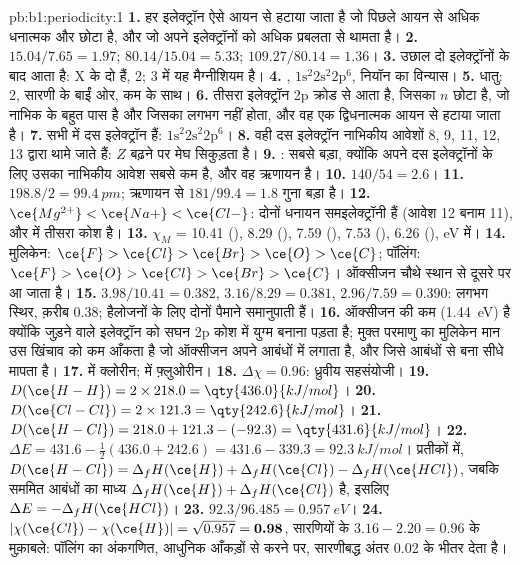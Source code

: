 \begin{solution}{pb:b1:periodicity:1}
\textbf{1.} हर इलेक्ट्रॉन ऐसे आयन से हटाया जाता है जो पिछले आयन से अधिक धनात्मक और
छोटा है, और जो अपने इलेक्ट्रॉनों को अधिक प्रबलता से थामता है।
\textbf{2.} $15.04/7.65 = 1.97$; $80.14/15.04 = 5.33$; $109.27/80.14 = 1.36$।
\textbf{3.} उछाल दो इलेक्ट्रॉनों के बाद आता है: X के दो  हैं,
 2;  3 में यह मैग्नीशियम है।
\textbf{4.} , $1\text{s}^2 2\text{s}^2 2\text{p}^6$, नियॉन का
विन्यास।
\textbf{5.} धातु:  2, सारणी के बाईं ओर, कम  के साथ।
\textbf{6.} तीसरा इलेक्ट्रॉन 2p क्रोड से आता है, जिसका $n$ छोटा है,
जो नाभिक के बहुत पास है और जिसका  लगभग नहीं होता, और वह एक
द्विधनात्मक आयन से हटाया जाता है।
\textbf{7.} सभी में दस इलेक्ट्रॉन हैं: $1\text{s}^2 2\text{s}^2 2\text{p}^6$।
\textbf{8.} वही दस इलेक्ट्रॉन नाभिकीय आवेशों 8, 9, 11,
12, 13 द्वारा थामे जाते हैं: $Z$ बढ़ने पर मेघ सिकुड़ता है।
\textbf{9.} : सबसे बड़ा, क्योंकि अपने दस इलेक्ट्रॉनों के लिए उसका
नाभिकीय आवेश सबसे कम है, और वह ऋणायन है।
\textbf{10.} $140/54 = 2.6$।
\textbf{11.} $198.8/2 = \qty{99.4}{pm}$; ऋणायन  से $181/99.4 = 1.8$
गुना बड़ा है।
\textbf{12.} $\ce{Mg^{2+}} < \ce{Na+} < \ce{Cl-}$: दोनों धनायन
समइलेक्ट्रॉनी हैं (आवेश 12 बनाम 11), और  में तीसरा कोश है।
\textbf{13.} $\chi_M$ = 10.41 (), 8.29 (), 7.59 (),
7.53 (), 6.26 (), eV में।
\textbf{14.} मुलिकेन: $\ce{F} > \ce{Cl} > \ce{Br} > \ce{O} > \ce{C}$;
पॉलिंग: $\ce{F} > \ce{O} > \ce{Cl} > \ce{Br} > \ce{C}$। ऑक्सीजन चौथे
स्थान से दूसरे पर आ जाता है।
\textbf{15.} $3.98/10.41 = 0.382$, $3.16/8.29 = 0.381$, $2.96/7.59 =
0.390$: लगभग स्थिर, क़रीब 0.38; हैलोजनों के लिए दोनों पैमाने
समानुपाती हैं।
\textbf{16.} ऑक्सीजन की  कम (\qty{1.44}{eV}) है
क्योंकि जुड़ने वाले इलेक्ट्रॉन को सघन 2p कोश में युग्म बनाना पड़ता है; मुक्त परमाणु
का मुलिकेन मान उस खिंचाव को कम आँकता है जो ऑक्सीजन अपने
आबंधों में लगाता है, और जिसे आबंधों से बना  सीधे मापता है।
\textbf{17.}  में क्लोरीन;  में फ़्लुओरीन।
\textbf{18.} $\Delta\chi = 0.96$: ध्रुवीय सहसंयोजी।
\textbf{19.} $D(\ce{H-H}) = 2 \times 218.0 = \qty{436.0}{kJ/mol}$।
\textbf{20.} $D(\ce{Cl-Cl}) = 2 \times 121.3 = \qty{242.6}{kJ/mol}$।
\textbf{21.} $D(\ce{H-Cl}) = 218.0 + 121.3 - (-92.3) = \qty{431.6}{kJ/mol}$।
\textbf{22.} $\Delta E = 431.6 - \tfrac12(436.0 + 242.6) = 431.6 - 339.3 =
\qty{92.3}{kJ/mol}$। प्रतीकों में, $D(\ce{H-Cl}) = \Delta_fH(\ce{H}) +
\Delta_fH(\ce{Cl}) - \Delta_fH(\ce{HCl})$, जबकि सममित आबंधों का
माध्य $\Delta_fH(\ce{H}) + \Delta_fH(\ce{Cl})$ है, इसलिए $\Delta E =
-\Delta_fH(\ce{HCl})$।
\textbf{23.} $92.3/96.485 = \qty{0.957}{eV}$।
\textbf{24.} $|\chi(\ce{Cl}) - \chi(\ce{H})| = \sqrt{0.957} =
\textbf{0.98}$, सारणियों के $3.16 - 2.20 = 0.96$ के मुक़ाबले: पॉलिंग का
अंकगणित, आधुनिक आँकड़ों से करने पर, सारणीबद्ध अंतर
0.02 के भीतर देता है।
\end{solution}
